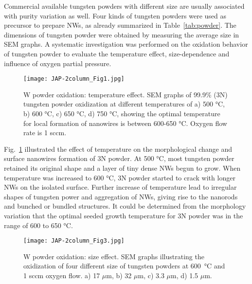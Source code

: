 Commercial available tungsten powders with different size are usually associated with purity variation as well. Four kinds of tungsten powders were used as precursor to prepare  NWs, as already summarized in Table~\ref{tab:powder}. The dimensions of tungsten powder were obtained by measuring the average size in SEM graphs. A systematic investigation was performed on the oxidation behavior of tungsten powder to evaluate the temperature effect, size-dependence and influence of oxygen partial pressure.

\begin{figure}[htb]
\centering
\texttt{[image: JAP-2column\_Fig1.jpg]}
\caption[W powder oxidation: temperature effect]{W powder oxidation: temperature effect. SEM graphs of 99.9\% (3N) tungsten powder oxidization at different temperatures of a) 500 \si{\degreeCelsius}, b) 600 \si{\degreeCelsius}, c) 650 \si{\degreeCelsius}, d) 750 \si{\degreeCelsius}, showing the optimal temperature for local formation of nanowires is between 600-650 \si{\degreeCelsius}. Oxygen flow rate is 1 sccm.}
\label{fig:pdtemp}
\end{figure}

Fig.~\ref{fig:pdtemp} illustrated the effect of temperature on the morphological change and surface nanowires formation of 3N powder. At 500 \si{\degreeCelsius}, most tungsten powder retained its original shape and a layer of tiny dense NWs begun to grow. When temperature was increased to 600 \si{\degreeCelsius}, 3N powder started to crack with longer NWs on the isolated surface. Further increase of temperature lead to irregular shapes of tungsten power and aggregation of NWs, giving rise to the nanorods and bunched or bundled structures. It could be determined from the morphology variation that the optimal seeded growth temperature for 3N powder was in the range of 600 to 650 \si{\degreeCelsius}.
\begin{figure}[htb]
\centering
\texttt{[image: JAP-2column\_Fig3.jpg]}
\caption[W powder oxidation: size effect]{W powder oxidation: size effect. SEM graphs illustrating the oxidization of four different size of tungsten powders at 600~\si{\degreeCelsius} and 1 sccm oxygen flow. a) 17 $\mu$m, b) 32 $\mu$m, c) 3.3 $\mu$m, d) 1.5 $\mu$m.}
\label{fig:pdsize}
\end{figure}


